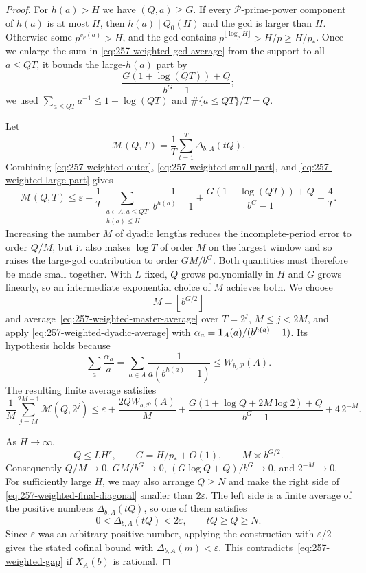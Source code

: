 \begin{proof}
For $h(a)>H$ we have $(Q,a)\ge G$.  If every $\mathcal P$-prime-power
component of $h(a)$ is at most $H$, then $h(a)\mid Q_0(H)$ and the gcd is
larger than $H$.  Otherwise some $p^{v_p(a)}>H$, and the gcd contains
$p^{\lfloor\log_pH\rfloor}>H/p\ge H/p_*$. Once we enlarge the sum in
\eqref{eq:257-weighted-gcd-average} from the support to all $a\le QT$,
it bounds the large-$h(a)$ part by
\begin{equation}\label{eq:257-weighted-large-part}
 \frac{G(1+\log(QT))+Q}{b^G-1};
\end{equation}
we used $\sum_{a\le QT}a^{-1}\le1+\log(QT)$ and
$\#\{a\le QT\}/T=Q$.

Let
\[
 \mathcal M(Q,T)=\frac1T\sum_{t=1}^{T}\Delta_{b,A}(tQ).
\]
Combining \eqref{eq:257-weighted-outer},
\eqref{eq:257-weighted-small-part}, and
\eqref{eq:257-weighted-large-part} gives
\begin{equation}\label{eq:257-weighted-master-average}
 \mathcal M(Q,T)\le
 \varepsilon+
 \frac1T\sum_{\substack{a\in A, a\le QT\\h(a)\le H}}
       \frac1{b^{h(a)}-1}
 +\frac{G(1+\log(QT))+Q}{b^G-1}+\frac4T.
\end{equation}
Increasing the number $M$ of dyadic lengths reduces the incomplete-period
error to order $Q/M$, but it also makes $\log T$ of order $M$ on the
largest window and so raises the large-gcd contribution to order
$GM/b^G$. Both quantities must therefore be made small together. With $L$
fixed, $Q$ grows polynomially in $H$ and $G$ grows linearly, so an
intermediate exponential choice of $M$ achieves both. We choose
\[
 M=\left\lfloor b^{G/2}\right\rfloor
\]
and average~\eqref{eq:257-weighted-master-average} over
$T=2^j$, $M\le j<2M$, and apply
\eqref{eq:257-weighted-dyadic-average} with
$\alpha_a={\bf1}_A(a)/(b^{h(a)}-1)$.  Its hypothesis holds because
\[
 \sum_a\frac{\alpha_a}{a}
 =\sum_{a\in A}\frac1{a(b^{h(a)}-1)}
 \le W_{b,\mathcal P}(A).
\]
The resulting finite average satisfies
\begin{equation}\label{eq:257-weighted-final-diagonal}
 \frac1M\sum_{j=M}^{2M-1}\mathcal M(Q,2^j)
 \le \varepsilon+\frac{2QW_{b,\mathcal P}(A)}M
 +\frac{G(1+\log Q+2M\log2)+Q}{b^G-1}
 +4\,2^{-M}.
\end{equation}

As $H\to\infty$,
\[
 Q\le LH^r,\qquad G=H/p_*+O(1),\qquad M\asymp b^{G/2}.
\]
Consequently $Q/M\to0$, $GM/b^G\to0$,
$(G\log Q+Q)/b^G\to0$, and $2^{-M}\to0$.  For sufficiently large $H$,
we may also arrange $Q\ge N$ and make the right side of
\eqref{eq:257-weighted-final-diagonal} smaller than $2\varepsilon$.
The left side is a finite average of the positive numbers
$\Delta_{b,A}(tQ)$, so one of them satisfies
\[
 0<\Delta_{b,A}(tQ)<2\varepsilon,
 \qquad tQ\ge Q\ge N.
\]
Since $\varepsilon$ was an arbitrary positive number, applying the
construction with $\varepsilon/2$ gives the stated cofinal bound with
$\Delta_{b,A}(m)<\varepsilon$.
This contradicts~\eqref{eq:257-weighted-gap} if $X_A(b)$ is rational.
\end{proof}

